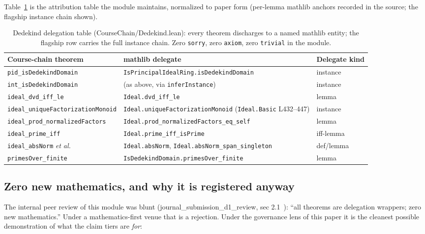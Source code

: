 Table~\ref{tab:dedekind-attr} is the attribution table the module
maintains, normalized to paper form (per-lemma mathlib anchors
recorded in the source; the flagship instance chain shown).

\begin{table}[t]
\caption{Dedekind delegation table (CourseChain/Dedekind.lean):
every theorem discharges to a named mathlib entity; the flagship
row carries the full instance chain. Zero \texttt{sorry}, zero
\texttt{axiom}, zero \texttt{trivial} in the module.}
\label{tab:dedekind-attr}
\begin{center}
\small
\begin{tabular}{@{}p{4.6cm}p{6.0cm}p{3.2cm}@{}}
\toprule
Course-chain theorem & mathlib delegate & Delegate kind \\
\midrule
\texttt{pid\_isDedekindDomain} &
\texttt{IsPrincipalIdealRing.\allowbreak isDedekindDomain} & instance \\
\texttt{int\_isDedekindDomain} & (as above, via
\texttt{inferInstance}) & instance \\
\texttt{ideal\_dvd\_iff\_le} & \texttt{Ideal.dvd\_iff\_le} &
lemma \\
\texttt{ideal\_\allowbreak uniqueFactorizationMonoid} &
\texttt{Ideal.\allowbreak uniqueFactorizationMonoid}
(\texttt{Ideal.Basic} L432--447) & instance \\
\texttt{ideal\_prod\_\allowbreak normalizedFactors} &
\texttt{Ideal.prod\_\allowbreak normalizedFactors\_\allowbreak eq\_self} & lemma \\
\texttt{ideal\_prime\_iff} & \texttt{Ideal.prime\_iff\_isPrime}
& iff-lemma \\
\texttt{ideal\_absNorm} \emph{et al.} &
\texttt{Ideal.absNorm}, \texttt{Ideal.absNorm\_\allowbreak span\_singleton}
& def/lemma \\
\texttt{primesOver\_finite} &
\texttt{IsDedekindDomain.\allowbreak primesOver\_finite} & lemma \\
\bottomrule
\end{tabular}
\end{center}
\end{table}

\subsection{Zero new mathematics, and why it is registered anyway}
\label{sec:dedekind-zero}
The internal peer review of this module was blunt
(journal\_submission\_d1\_review, sec 2.1~\cite{sylvad1review2026}): ``all theorems are
delegation wrappers; zero new mathematics.'' Under a
mathematics-first venue that is a rejection. Under the governance
lens of this paper it is the cleanest possible demonstration of
what the claim tiers are \emph{for}:

